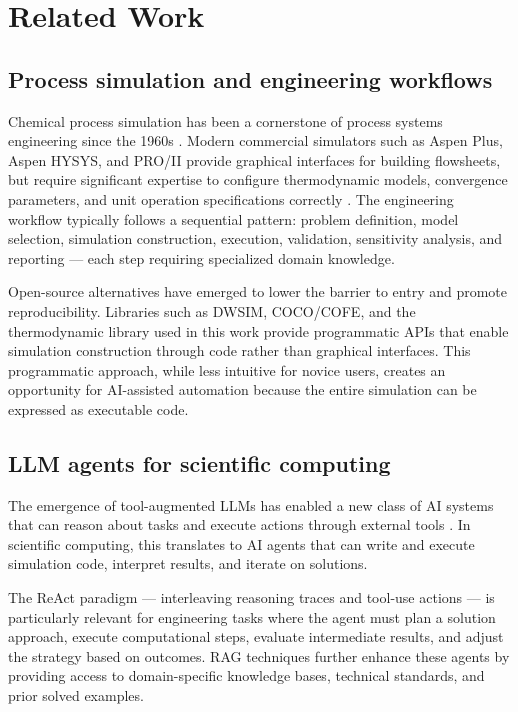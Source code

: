 \documentclass[review,3p]{elsarticle}
\begin{document}
\section{Related Work}


\subsection{Process simulation and engineering workflows}

Chemical process simulation has been a cornerstone of process systems engineering since the 1960s \citep{Grossmann2005}. Modern commercial simulators such as Aspen Plus, Aspen HYSYS, and PRO/II provide graphical interfaces for building flowsheets, but require significant expertise to configure thermodynamic models, convergence parameters, and unit operation specifications correctly \citep{SeiderLewinWidagdo2009}. The engineering workflow typically follows a sequential pattern: problem definition, model selection, simulation construction, execution, validation, sensitivity analysis, and reporting --- each step requiring specialized domain knowledge.

Open-source alternatives have emerged to lower the barrier to entry and promote reproducibility. Libraries such as DWSIM, COCO/COFE, and the thermodynamic library used in this work provide programmatic APIs that enable simulation construction through code rather than graphical interfaces. This programmatic approach, while less intuitive for novice users, creates an opportunity for AI-assisted automation because the entire simulation can be expressed as executable code.

\subsection{LLM agents for scientific computing}

The emergence of tool-augmented LLMs has enabled a new class of AI systems that can reason about tasks and execute actions through external tools \citep{Yao2023, Schick2024}. In scientific computing, this translates to AI agents that can write and execute simulation code, interpret results, and iterate on solutions.

The ReAct paradigm \citep{Yao2023} --- interleaving reasoning traces and tool-use actions --- is particularly relevant for engineering tasks where the agent must plan a solution approach, execute computational steps, evaluate intermediate results, and adjust the strategy based on outcomes. RAG techniques \citep{Lewis2020} further enhance these agents by providing access to domain-specific knowledge bases, technical standards, and prior solved examples.
\end{document}
